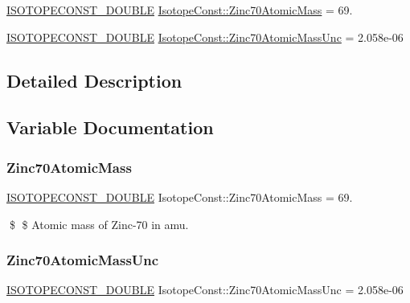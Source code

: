 \begin{DoxyCompactItemize}
\item 
\mbox{\hyperlink{group___isotope_const-_macros_ga8f45a7272ce02c0b4c65c44636ed719a}{I\+S\+O\+T\+O\+P\+E\+C\+O\+N\+S\+T\+\_\+\+D\+O\+U\+B\+LE}} \mbox{\hyperlink{group___isotope_const-_zinc-_zn70_gaab12cec5a611e6aec8f73b5d4e9fbfba}{Isotope\+Const\+::\+Zinc70\+Atomic\+Mass}} = 69.
\item 
\mbox{\hyperlink{group___isotope_const-_macros_ga8f45a7272ce02c0b4c65c44636ed719a}{I\+S\+O\+T\+O\+P\+E\+C\+O\+N\+S\+T\+\_\+\+D\+O\+U\+B\+LE}} \mbox{\hyperlink{group___isotope_const-_zinc-_zn70_ga0b41476b30f676c51875e9768a206523}{Isotope\+Const\+::\+Zinc70\+Atomic\+Mass\+Unc}} = 2.\+058e-\/06
\end{DoxyCompactItemize}


\subsection{Detailed Description}


\subsection{Variable Documentation}
\mbox{\label{group___isotope_const-_zinc-_zn70_gaab12cec5a611e6aec8f73b5d4e9fbfba}} 
\subsubsection{\texorpdfstring{Zinc70\+Atomic\+Mass}{Zinc70AtomicMass}}
{\footnotesize\ttfamily \mbox{\hyperlink{group___isotope_const-_macros_ga8f45a7272ce02c0b4c65c44636ed719a}{I\+S\+O\+T\+O\+P\+E\+C\+O\+N\+S\+T\+\_\+\+D\+O\+U\+B\+LE}} Isotope\+Const\+::\+Zinc70\+Atomic\+Mass = 69.}

\$ \$ Atomic mass of Zinc-\/70 in amu. \mbox{\label{group___isotope_const-_zinc-_zn70_ga0b41476b30f676c51875e9768a206523}} 
\subsubsection{\texorpdfstring{Zinc70\+Atomic\+Mass\+Unc}{Zinc70AtomicMassUnc}}
{\footnotesize\ttfamily \mbox{\hyperlink{group___isotope_const-_macros_ga8f45a7272ce02c0b4c65c44636ed719a}{I\+S\+O\+T\+O\+P\+E\+C\+O\+N\+S\+T\+\_\+\+D\+O\+U\+B\+LE}} Isotope\+Const\+::\+Zinc70\+Atomic\+Mass\+Unc = 2.\+058e-\/06}

